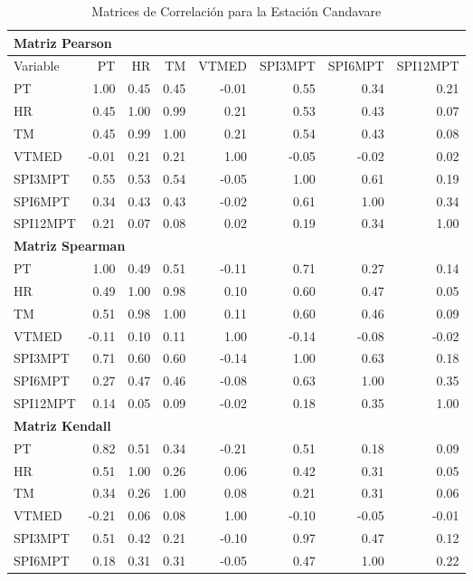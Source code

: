 \begin{table}[ht]
\centering
\caption{Matrices de Correlación para la Estación Candavare}
\begin{tabular}{lrrrrrrr}
\toprule
\multicolumn{8}{l}{\textbf{Matriz Pearson}} \\
\midrule
Variable & PT & HR & TM & VTMED & SPI3MPT & SPI6MPT & SPI12MPT \\
\midrule
PT       & 1.00 & 0.45 & 0.45 & -0.01 & 0.55 & 0.34 & 0.21 \\
HR       & 0.45 & 1.00 & 0.99 & 0.21 & 0.53 & 0.43 & 0.07 \\
TM       & 0.45 & 0.99 & 1.00 & 0.21 & 0.54 & 0.43 & 0.08 \\
VTMED    & -0.01 & 0.21 & 0.21 & 1.00 & -0.05 & -0.02 & 0.02 \\
SPI3MPT  & 0.55 & 0.53 & 0.54 & -0.05 & 1.00 & 0.61 & 0.19 \\
SPI6MPT  & 0.34 & 0.43 & 0.43 & -0.02 & 0.61 & 1.00 & 0.34 \\
SPI12MPT & 0.21 & 0.07 & 0.08 & 0.02 & 0.19 & 0.34 & 1.00 \\
\midrule
\multicolumn{8}{l}{\textbf{Matriz Spearman}} \\
\midrule
PT       & 1.00 & 0.49 & 0.51 & -0.11 & 0.71 & 0.27 & 0.14 \\
HR       & 0.49 & 1.00 & 0.98 & 0.10 & 0.60 & 0.47 & 0.05 \\
TM       & 0.51 & 0.98 & 1.00 & 0.11 & 0.60 & 0.46 & 0.09 \\
VTMED    & -0.11 & 0.10 & 0.11 & 1.00 & -0.14 & -0.08 & -0.02 \\
SPI3MPT  & 0.71 & 0.60 & 0.60 & -0.14 & 1.00 & 0.63 & 0.18 \\
SPI6MPT  & 0.27 & 0.47 & 0.46 & -0.08 & 0.63 & 1.00 & 0.35 \\
SPI12MPT & 0.14 & 0.05 & 0.09 & -0.02 & 0.18 & 0.35 & 1.00 \\
\midrule
\multicolumn{8}{l}{\textbf{Matriz Kendall}} \\
\midrule
PT       & 0.82 & 0.51 & 0.34 & -0.21 & 0.51 & 0.18 & 0.09 \\
HR       & 0.51 & 1.00 & 0.26 & 0.06 & 0.42 & 0.31 & 0.05 \\
TM       & 0.34 & 0.26 & 1.00 & 0.08 & 0.21 & 0.31 & 0.06 \\
VTMED    & -0.21 & 0.06 & 0.08 & 1.00 & -0.10 & -0.05 & -0.01 \\
SPI3MPT  & 0.51 & 0.42 & 0.21 & -0.10 & 0.97 & 0.47 & 0.12 \\
SPI6MPT  & 0.18 & 0.31 & 0.31 & -0.05 & 0.47 & 1.00 & 0.22 \\

\end{tabular}
\end{table}
